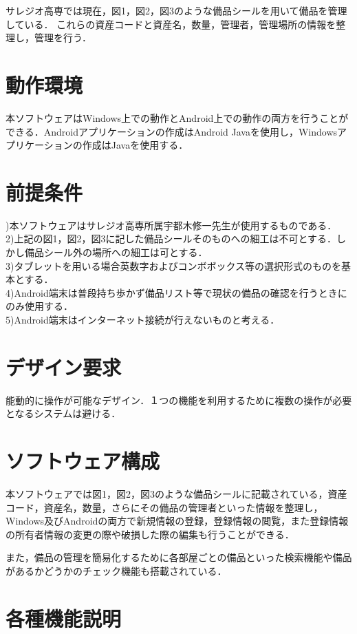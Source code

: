 \documentclass[11pt,a4j]{jarticle}
\begin{document}
サレジオ高専では現在，図1，図2，図3のような備品シールを用いて備品を管理している．
これらの資産コードと資産名，数量，管理者，管理場所の情報を整理し，管理を行う．

  \section{動作環境}
本ソフトウェアはWindows上での動作とAndroid上での動作の両方を行うことができる．Androidアプリケーションの作成はAndroid Javaを使用し，Windowsアプリケーションの作成はJavaを使用する．

  \section{前提条件}
  )本ソフトウェアはサレジオ高専所属宇都木修一先生が使用するものである．
\\2)上記の図1，図2，図3に記した備品シールそのものへの細工は不可とする．しかし備品シール外の場所への細工は可とする．
\\3)タブレットを用いる場合英数字およびコンボボックス等の選択形式のものを基本とする．
\\4)Android端末は普段持ち歩かず備品リスト等で現状の備品の確認を行うときにのみ使用する．
\\5)Android端末はインターネット接続が行えないものと考える．

  \section{デザイン要求}
  能動的に操作が可能なデザイン．１つの機能を利用するために複数の操作が必要となるシステムは避ける．

  \section{ソフトウェア構成}
  本ソフトウェアでは図1，図2，図3のような備品シールに記載されている，資産コード，資産名，数量，さらにその備品の管理者といった情報を整理し，Windows及びAndroidの両方で新規情報の登録，登録情報の閲覧，また登録情報の所有者情報の変更の際や破損した際の編集も行うことができる．
  
  また，備品の管理を簡易化するために各部屋ごとの備品といった検索機能や備品があるかどうかのチェック機能も搭載されている．

  \newpage
  \section{各種機能説明}
\end{document}
